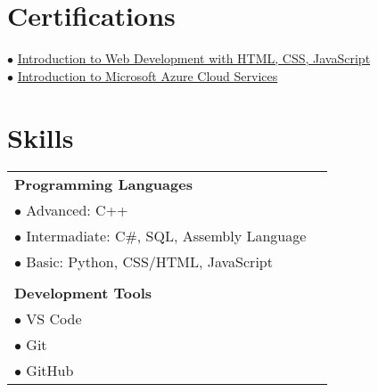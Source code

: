 \documentclass[a4paper,12pt]{article}
\begin{document}
\section{Certifications}
$\bullet$ \href{https://coursera.org/share/219dc4c656cd4114416bdb36af064e2a}{Introduction to Web Development with HTML, CSS, JavaScript}\\
$\bullet$ \href{https://coursera.org/share/3c380cf6e3a7f9913eeedc4b92bd9193}{Introduction to Microsoft Azure Cloud Services}

\section{Skills}
\begin{tabularx} {\linewidth}{@{}l X@{}}
\textbf{Programming Languages} & \\
$\bullet$ Advanced: C++ \\
$\bullet$ Intermadiate: C\#, SQL, Assembly Language \\ 
$\bullet$ Basic: Python, CSS/HTML, JavaScript
\\ \\
\textbf{Development Tools}  & \\
$\bullet$ VS Code \\
$\bullet$ Git \\
$\bullet$ GitHub \\
\end{tabularx}
\end{document}
